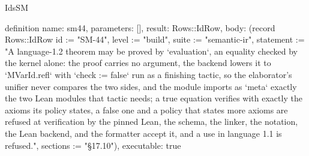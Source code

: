 \begin{lexlean}{IdsSM}
\begin{semanticmodule}
definition{
  name: sm44,
  parameters: [],
  result: Rows::IdRow,
  body: (record Rows::IdRow {id := "SM-44", level := "build", suite := "semantic-ir", statement := "A language-1.2 theorem may be proved by `evaluation`, an equality checked by the kernel alone: the proof carries no argument, the backend lowers it to `MVarId.refl` with `check := false` run as a finishing tactic, so the elaborator's unifier never compares the two sides, and the module imports as `meta` exactly the two Lean modules that tactic needs; a true equation verifies with exactly the axioms its policy states, a false one and a policy that states more axioms are refused at verification by the pinned Lean, the schema, the linker, the notation, the Lean backend, and the formatter accept it, and a use in language 1.1 is refused.", sections := "§17.10"}),
  executable: true
}
\end{semanticmodule}
\end{lexlean}
